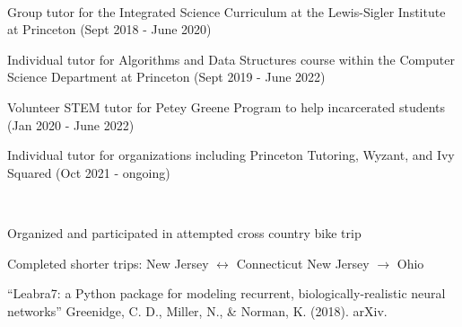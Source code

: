 \documentclass[a4paper]{MagicalCV}
\begin{document}
\begin{minipage}[t]{0.66\textwidth}
 \\
\vspace{\topsep} %
\begin{tightemize}
\item Group tutor for the Integrated Science Curriculum at the Lewis-Sigler Institute at Princeton (Sept 2018 - June 2020)
\item Individual tutor for Algorithms and Data Structures course within the Computer Science Department at Princeton (Sept 2019 - June 2022)
\item Volunteer STEM tutor for Petey Greene Program to help incarcerated students (Jan 2020 - June 2022)
\item Individual tutor for organizations including Princeton Tutoring, Wyzant, and Ivy Squared (Oct 2021 - ongoing)
\end{tightemize}
\sectionsep


 \\
\vspace{\topsep} %
\begin{tightemize}
\item Organized and participated in attempted cross country bike trip
\item Completed shorter trips:
    \subitem New Jersey $\longleftrightarrow$ Connecticut
    \subitem New Jersey $\rightarrow$ Ohio
\end{tightemize}
\sectionsep


“Leabra7: a Python package for modeling recurrent, biologically-realistic neural networks” Greenidge, C. D., Miller, N., & Norman, K. (2018). arXiv.
\end{minipage} 
\end{document}
